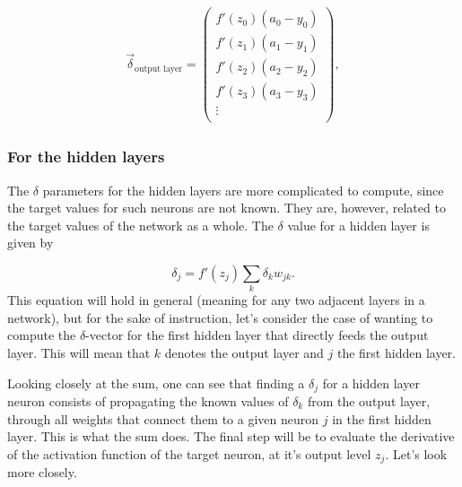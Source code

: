 \documentclass[12pt]{article}
\begin{document}
 \begin{align}
 {\vec \delta}_{\textrm{output layer}}=
    \begin{pmatrix}
        f'(z_0)(a_0-y_0) \\
        f'(z_1)(a_1-y_1) \\
        f'(z_2)(a_2-y_2) \\
        f'(z_3)(a_3-y_3) \\
        \vdots\\
         \end{pmatrix},
 \end{align}

 
 
\subsubsection*{For the hidden layers}

The $\delta$ parameters for the hidden layers are more complicated to compute, since the target values for such neurons are not known. They are, however, related to the target values of the network as a whole.  The $\delta$ value for a hidden layer is given by

\begin{equation}
\delta_j=f'(z_j)\sum_k\delta_k w_{jk}.
\label{eqn_dj}
\end{equation}
This equation will hold in general (meaning for any two adjacent layers in a network), but for the sake of instruction, let's consider the case of wanting to compute the $\delta$-vector for the first hidden layer that directly feeds the output layer. This will mean that $k$ denotes the output layer and $j$ the first hidden layer. 

Looking closely at the sum, one can see that finding a $\delta_j$ for a hidden layer neuron consists of propagating the known values of $\delta_k$ from the output layer, through all weights that connect them to a given neuron $j$ in the first hidden layer. This is what the sum does. The final step will be to evaluate the derivative of the activation function of the target neuron, at it's output level $z_j$. Let's look more closely.
\end{document}
